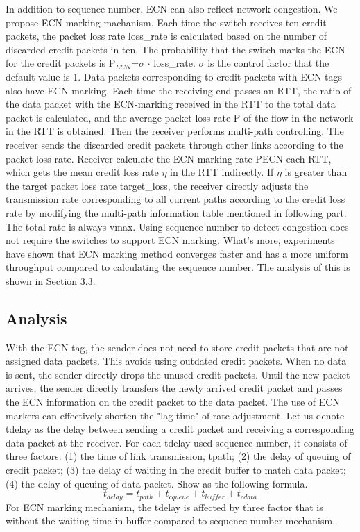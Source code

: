 \documentclass[conference,compsoc]{IEEEtran}
\begin{document}
In addition to sequence number, ECN can also reflect network congestion. We propose ECN marking machanism. Each time the switch receives ten credit packets,  the packet loss rate loss\_rate is calculated based on the number of discarded credit packets in ten. The probability that the switch marks the ECN for the credit packets is P$_{ECN}$=$\sigma$ $\cdot$ loss\_rate. $\sigma$ is the control factor that the default value is 1. Data packets corresponding to credit packets with ECN tags also have ECN-marking. Each time the receiving end passes an RTT, the ratio of the data packet with the ECN-marking received in the RTT to the total data packet is calculated, and the average packet loss rate P of the flow in the network in the RTT is obtained. Then the receiver performs multi-path controlling. The receiver sends the discarded credit packets through other links according to the packet loss rate. Receiver calculate the ECN-marking rate PECN each RTT, which gets the mean credit loss rate $\eta$ in the RTT indirectly. If $\eta$ is greater than the target packet loss rate target\_loss, the receiver directly adjusts the transmission rate corresponding to all current paths according to the credit loss rate by modifying the multi-path information table mentioned in following part. The total rate is always vmax. Using sequence number to detect congestion does not require the switches to support ECN marking. What's more, experiments have shown that ECN marking method converges faster and has a more uniform throughput compared to calculating the sequence number. The analysis of this is shown in Section 3.3.

\subsection{Analysis}
With the ECN tag, the sender does not need to store credit packets that are not assigned data packets. This avoids using outdated credit packets. When no data is sent, the sender directly drops the unused credit packets. Until the new packet arrives, the sender directly transfers the newly arrived credit packet and passes the ECN information on the credit packet to the data packet. The use of ECN markers can effectively shorten the "lag time" of rate adjustment. Let us denote tdelay as the delay between sending a credit packet and receiving a corresponding data packet at the receiver. For each tdelay used sequence number, it consists of three factors: (1) the time of link transmission, tpath; (2) the delay of queuing of credit packet; (3) the delay of waiting in the credit buffer to match data packet; (4) the delay of queuing of data packet. Show as the following formula.
\begin{equation}
t_{delay} = t_{path} + t_{cqueue} + t_{buffer} + t_{cdata}
\end{equation}
For ECN marking mechanism, the tdelay is affected by three factor that is without the waiting time in buffer compared to sequence number mechanism.
\end{document}
